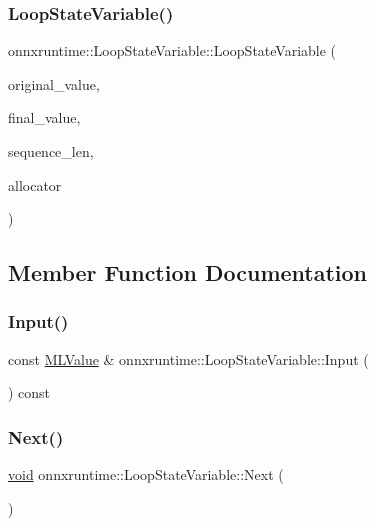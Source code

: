 \subsubsection{\texorpdfstring{Loop\+State\+Variable()}{LoopStateVariable()}}
{\footnotesize\ttfamily onnxruntime\+::\+Loop\+State\+Variable\+::\+Loop\+State\+Variable (\begin{DoxyParamCaption}\item[{const \mbox{\hyperlink{classonnxruntime_1_1MLValue}{M\+L\+Value}} \&}]{original\+\_\+value,  }\item[{\mbox{\hyperlink{classonnxruntime_1_1MLValue}{M\+L\+Value}} \&}]{final\+\_\+value,  }\item[{const int64\+\_\+t}]{sequence\+\_\+len,  }\item[{\mbox{\hyperlink{namespaceonnxruntime_a6cdac724c5dcefded3a63f08dae58fda}{Allocator\+Ptr}} \&}]{allocator }\end{DoxyParamCaption})}



\subsection{Member Function Documentation}
\mbox{\label{classonnxruntime_1_1LoopStateVariable_a0cad42b00c0c870f55e7e4f8f128e3f1}} 
\subsubsection{\texorpdfstring{Input()}{Input()}}
{\footnotesize\ttfamily const \mbox{\hyperlink{classonnxruntime_1_1MLValue}{M\+L\+Value}} \& onnxruntime\+::\+Loop\+State\+Variable\+::\+Input (\begin{DoxyParamCaption}{ }\end{DoxyParamCaption}) const}

\mbox{\label{classonnxruntime_1_1LoopStateVariable_a6f75bdd576a44b30f651cdd05c4a28a8}} 
\subsubsection{\texorpdfstring{Next()}{Next()}}
{\footnotesize\ttfamily \mbox{\hyperlink{mlasi_8h_a88f941d423cb2a819b70a1358982b1a6}{void}} onnxruntime\+::\+Loop\+State\+Variable\+::\+Next (\begin{DoxyParamCaption}{ }\end{DoxyParamCaption})}


